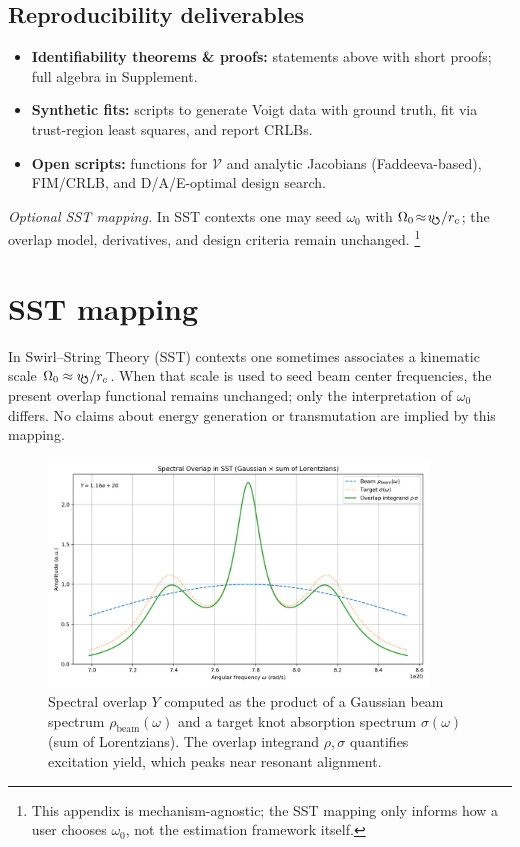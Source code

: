 \documentclass[aps,prb,amsmath,amssymb]{revtex4-2} %
\newcommand{\vswirl}{v_{\!\mkern-2mu\scriptstyle\boldsymbol{\circlearrowleft}}}
\newcommand{\rc}{r_c}
\begin{document}
\subsection{Reproducibility deliverables}
    \begin{itemize}
        \item \textbf{Identifiability theorems \& proofs:} statements above with short proofs; full algebra in Supplement.
        \item \textbf{Synthetic fits:} scripts to generate Voigt data with ground truth, fit via trust-region least squares, and report CRLBs.
        \item \textbf{Open scripts:} functions for $\mathcal{V}$ and analytic Jacobians (Faddeeva-based), FIM/CRLB, and D/A/E-optimal design search.
    \end{itemize}

    \noindent\textit{Optional SST mapping.} In SST contexts one may seed $\omega_0$ with
    $\Omega_0\!\approx\!\vswirl/\rc$; the overlap model, derivatives, and design criteria remain unchanged.%
    \footnote{This appendix is mechanism-agnostic; the SST mapping only informs how a user chooses $\omega_0$,
        not the estimation framework itself.}

    \section*{SST mapping}
    In Swirl--String Theory (SST) contexts one sometimes associates a kinematic scale
    $\Omega_0 \approx \vswirl/\rc$. When that scale is used to seed beam center frequencies,
    the present overlap functional remains unchanged; only the interpretation of $\omega_0$ differs.
    No claims about energy generation or transmutation are implied by this mapping.

    \begin{figure}[h!]
        \centering
        \includegraphics[width=0.9\textwidth]{sst_spectral_overlap}
        \caption{Spectral overlap $Y$ computed as the product of a Gaussian beam spectrum $\rho_{\mathrm{beam}}(\omega)$ and a target knot absorption spectrum $\sigma(\omega)$ (sum of Lorentzians). The overlap integrand $\rho,\sigma$ quantifies excitation yield, which peaks near resonant alignment.}
    \end{figure}
\end{document}
